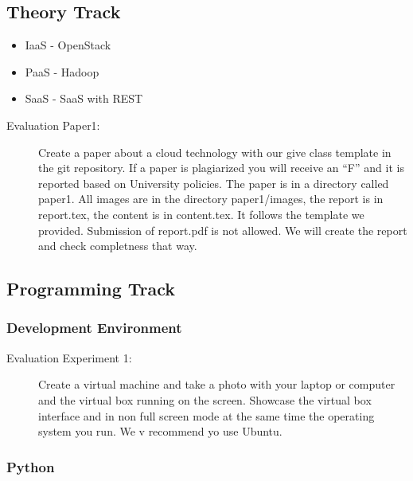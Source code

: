 \subsection{Theory Track}

\begin{itemize}
\item IaaS - OpenStack
\item PaaS - Hadoop
\item SaaS - SaaS with REST
\end{itemize}

\begin{description}
\item[Evaluation Paper1:] Create a paper about a cloud technology with
  our give class template in the git repository. If a paper is
  plagiarized you will receive an ``F'' and it is reported based on
  University policies. The paper is in a directory called paper1. All
  images are in the directory paper1/images, the report is in
  report.tex, the content is in content.tex. It follows the template
  we provided. Submission of report.pdf is not allowed. We will create
  the report and check completness that way.
\end{description}

\subsection{Programming Track}

\subsubsection{Development Environment}



\begin{description}
\item[Evaluation Experiment 1:] Create a virtual machine and take a
  photo with your laptop or computer and the virtual box running on
  the screen. Showcase the virtual box interface and in non full
  screen mode at the same time the operating system you run. We
v  recommend yo use Ubuntu.
\end{description}

\subsubsection{Python}

